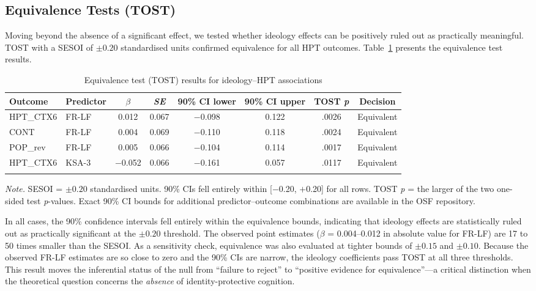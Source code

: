 \documentclass[referee,pdflatex,sn-apa]{sn-jnl}
\begin{document}
\subsection{Equivalence Tests (TOST)}\label{subsec:tost}

Moving beyond the absence of a significant effect, we tested whether ideology effects can be positively ruled out as practically meaningful. TOST with a SESOI of $\pm 0.20$ standardised units confirmed equivalence for all HPT outcomes. Table~\ref{tab:tost} presents the equivalence test results.

\begin{table}[!t]
\caption{Equivalence test (TOST) results for ideology--HPT associations}\label{tab:tost}
\begin{tabular}{llcccccc}
\toprule
Outcome & Predictor & $\beta$ & \textit{SE} & 90\% CI lower & 90\% CI upper & TOST \textit{p} & Decision \\
\midrule
HPT\_CTX6 & FR-LF & 0.012 & 0.067 & $-$0.098 & 0.122 & .0026 & Equivalent \\
CONT & FR-LF & 0.004 & 0.069 & $-$0.110 & 0.118 & .0024 & Equivalent \\
POP\_rev & FR-LF & 0.005 & 0.066 & $-$0.104 & 0.114 & .0017 & Equivalent \\
HPT\_CTX6 & KSA-3 & $-$0.052 & 0.066 & $-$0.161 & 0.057 & .0117 & Equivalent \\
\botrule
\end{tabular}

\medskip\noindent\small\textit{Note.} SESOI = $\pm 0.20$ standardised units. 90\% CIs fell entirely within [$-$0.20, $+$0.20] for all rows. TOST \textit{p} = the larger of the two one-sided test \textit{p}-values. Exact 90\% CI bounds for additional predictor--outcome combinations are available in the OSF repository.
\end{table}

In all cases, the 90\% confidence intervals fell entirely within the equivalence bounds, indicating that ideology effects are statistically ruled out as practically significant at the $\pm 0.20$ threshold. The observed point estimates ($\beta$ = 0.004--0.012 in absolute value for FR-LF) are 17 to 50 times smaller than the SESOI. As a sensitivity check, equivalence was also evaluated at tighter bounds of $\pm 0.15$ and $\pm 0.10$. Because the observed FR-LF estimates are so close to zero and the 90\% CIs are narrow, the ideology coefficients pass TOST at all three thresholds. This result moves the inferential status of the null from ``failure to reject'' to ``positive evidence for equivalence''---a critical distinction when the theoretical question concerns the \textit{absence} of identity-protective cognition.
\end{document}
